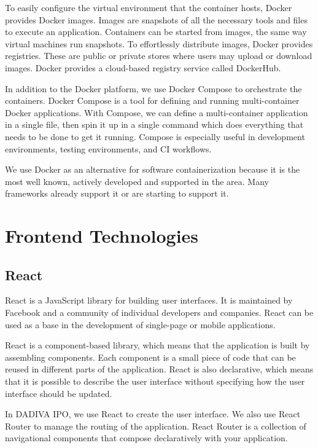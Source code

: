 To easily configure the virtual environment that the container hosts, Docker provides Docker images. Images are snapshots of all the necessary tools and files to execute an application. 
Containers can be started from images, the same way virtual machines run snapshots. To effortlessly distribute images, Docker provides registries. These are public or private stores where users may upload or download images. Docker provides a cloud-based registry service called DockerHub.

In addition to the Docker platform, we use Docker Compose to orchestrate the containers. Docker Compose is a tool for defining and running multi-container Docker applications. With Compose, we can define a multi-container application in a single file, then spin it up in a single command which does everything that needs to be done to get it running. Compose is especially useful in development environments, testing environments, and CI workflows. 

We use Docker as an alternative for software containerization because it is the most well known, actively developed and supported in the area. Many frameworks already support it or are starting to support it.

\section{Frontend Technologies}

\subsection{React}

React is a JavaScript library for building user interfaces. It is maintained by Facebook and a community of individual developers and companies. React can be used as a base in the development of single-page or mobile applications.

React is a component-based library, which means that the application is built by assembling components. Each component is a small piece of code that can be reused in different parts of the application. React is also declarative, which means that it is possible to describe the user interface without specifying how the user interface should be updated.

In DADIVA IPO, we use React to create the user interface. We also use React Router to manage the routing of the application. React Router is a collection of navigational components that compose declaratively with your application.

